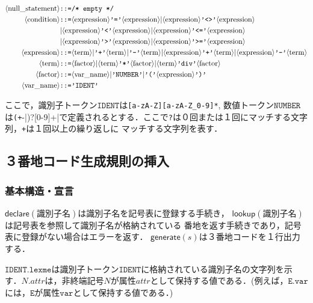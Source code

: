 \documentclass[dvipdfmx,a4j]{jbook}
\begin{document}
\begin{align*}
\langle\mathrm{null\_statement}\rangle & \texttt{::=} \texttt{/* empty */}\\
\langle\mathrm{condition}\rangle & \texttt{::=} \langle\mathrm{expression}\rangle \texttt{'='} \langle\mathrm{expression}\rangle
            \vert \langle\mathrm{expression}\rangle \texttt{'<>'} \langle\mathrm{expression}\rangle\\
            & \vert \langle\mathrm{expression}\rangle \texttt{'<'} \langle\mathrm{expression}\rangle
            \vert \langle\mathrm{expression}\rangle \texttt{'<='} \langle\mathrm{expression}\rangle\\
            & \vert \langle\mathrm{expression}\rangle \texttt{'>'} \langle\mathrm{expression}\rangle
            \vert \langle\mathrm{expression}\rangle \texttt{'>='} \langle\mathrm{expression}\rangle\\
\langle\mathrm{expression}\rangle & \texttt{::=} \langle\mathrm{term}\rangle
              \vert \texttt{'+'} \langle\mathrm{term}\rangle
              \vert \texttt{'-'} \langle\mathrm{term}\rangle
              \vert \langle\mathrm{expression}\rangle \texttt{'+'} \langle\mathrm{term}\rangle
              \vert \langle\mathrm{expression}\rangle \texttt{'-'} \langle\mathrm{term}\rangle\\
\langle\mathrm{term}\rangle & \texttt{::=} \langle\mathrm{factor}\rangle
        \vert \langle\mathrm{term}\rangle \texttt{'*'} \langle\mathrm{factor}\rangle
        \vert \langle\mathrm{term}\rangle \texttt{'div'} \langle\mathrm{factor}\rangle\\
\langle\mathrm{factor}\rangle & \texttt{::=} \langle\mathrm{var\_name}\rangle
          \vert \texttt{'NUMBER'}
          \vert \texttt{'('} \langle\mathrm{expression}\rangle \texttt{')'}\\
\langle\mathrm{var\_name}\rangle & \texttt{::=} \texttt{'IDENT'}\\
\end{align*}

ここで，識別子トークン$\texttt{IDENT}$は\verb|[a-zA-Z][a-zA-Z_0-9]*|, 数値トークン$\texttt{NUMBER}$は\verb|(+|-|)?[0-9]+|で定義されるとする．ここで\verb|?|は０回または１回にマッチする文字列，\verb|+|は１回以上の繰り返しに
マッチする文字列を表す．

\subsection{３番地コード生成規則の挿入}

\subsubsection{基本構造・宣言}

$\mathsf{declare}(\mbox{識別子名})$は識別子名を記号表に登録する手続き，
$\mathsf{lookup}(\mbox{識別子名})$は記号表を参照して識別子名が格納されている
番地を返す手続きであり，記号表に登録がない場合はエラーを返す．
$\mathsf{generate}(s)$は３番地コードを１行出力する．

$\texttt{IDENT.lexme}$は識別子トークン$\texttt{IDENT}$に格納されている識別子名の文字列を示す．$N.attr$は，非終端記号$N$が属性$attr$として保持する値である．(例えば，$\texttt{E.var}$には，$\texttt{E}$が属性$\texttt{var}$として保持する値である．)
\end{document}
